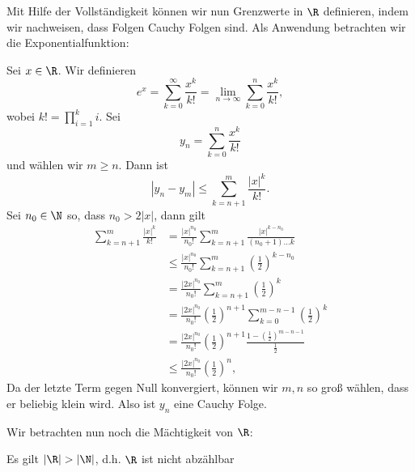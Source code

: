 \documentclass[letterpaper,10pt,english]{jupyterBook}
\begin{document}
Mit Hilfe der Vollständigkeit können wir nun Grenzwerte in \(\R\) definieren, indem wir nachweisen, dass Folgen Cauchy Folgen sind. Als Anwendung betrachten wir die Exponentialfunktion:
\label{grundlagen/zahlensysteme:example-25}
\begin{example}{}{}



Sei \(x \in \R\). Wir definieren
\begin{equation*}
 e^x = \sum_{k=0}^\infty \frac{x^k}{k!} = \lim_{n \rightarrow \infty} \sum_{k=0}^n \frac{x^k}{k!},
\end{equation*}
wobei \(k! = \prod_{i=1}^k i\). Sei
\begin{equation*}
y_n = \sum_{k=0}^n \frac{x^k}{k!}
\end{equation*}
und wählen wir \(m \geq n\). Dann ist
\begin{equation*}
|y_n - y_m| \leq \sum_{k=n+1}^m \frac{|x|^k}{k!}.
\end{equation*}
Sei \(n_0 \in \N\) so, dass \(n_0 > 2{|x|} \), dann gilt
\begin{align*}
\sum_{k=n+1}^m \frac{|x|^k}{k!} &= \frac{|x|^{n_0}}{n_0!} \sum_{k=n+1}^m \frac{|x|^{k-n_0}}{(n_0+1)\ldots k} \\
&\leq \frac{|x|^{n_0}}{n_0!} \sum_{k=n+1}^m \left(\frac{1}2\right)^{k-n_0} \\
&= \frac{|2x|^{n_0}}{n_0!} \sum_{k=n+1}^m \left(\frac{1}2\right)^{k} \\
&= \frac{|2x|^{n_0}}{n_0!} \left(\frac{1}2\right)^{n+1} \sum_{k=0}^{m-n-1} \left(\frac{1}2\right)^{k} \\
&= \frac{|2x|^{n_0}}{n_0!} \left(\frac{1}2\right)^{n+1} \frac{1-\left(\frac{1}2\right)^{m-n-1}}{\frac{1}2} \\
&\leq \frac{|2x|^{n_0}}{n_0!} \left(\frac{1}2\right)^{n},
\end{align*}
Da der letzte Term gegen Null konvergiert, können wir \(m,n\) so groß wählen, dass er beliebig klein wird. Also ist \(y_n\) eine Cauchy Folge.
\end{example}

Wir betrachten nun noch die Mächtigkeit von \(\R\):
\label{grundlagen/zahlensysteme:theorem-26}
\begin{theorem}{}{}



Es gilt \(|\R| > |\N|\), d.h. \(\R\) ist nicht abzählbar
\end{theorem}
\end{document}
